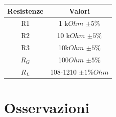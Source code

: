 \documentclass[journal, a4paper]{IEEEtran}
\begin{document}
{ 
\centering

\begin{tabular}{|c|c|}
\hline \textbf{Resistenze} & \textbf{Valori} \\ 
\hline R1 & 1  k$\si{Ohm}$ $\pm 5\%$\\ 
\hline R2 & 10  k$\si{Ohm}$ $\pm 5\%$ \\ 
\hline R3 & 10k$\si{Ohm}$ $\pm 5\%$\\ 
\hline $R_G$ & 100$\si{Ohm}$ $\pm 5\%$\\ 
\hline $R_L$ & 108-1210 $\pm 1\% \si{Ohm}$ \\ 
\hline 
\end{tabular}

}


\section{Osservazioni}
\end{document}
